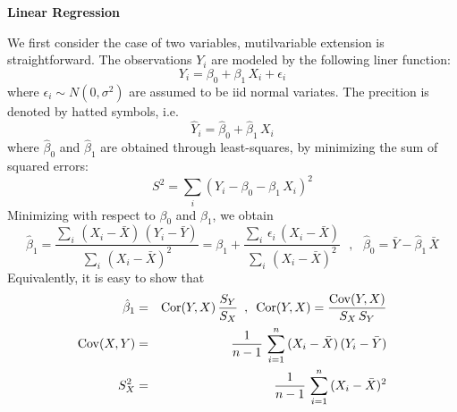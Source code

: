 \documentclass[aps,prl,preprint,superscriptaddress]{revtex4-1}
\begin{document}
% 

\vspace{0.5cm}

\begin{center}
{\bf Linear Regression}
\end{center}

We first consider the case of two variables, mutilvariable extension is straightforward. The observations $Y_i$ 
are modeled by the following liner function:
%
\begin{equation}
Y_i = \beta_0 + \beta_1\, X_i + \epsilon_i
\end{equation}
%
where $\epsilon_i \sim N(0,\sigma^2)$ are assumed to be iid normal variates. The precition is denoted by hatted symbols, 
i.e.
%
\begin{equation}
{\hat Y}_i = {\hat \beta}_0 + {\hat \beta}_1\, X_i
\end{equation}
%
where ${\hat \beta}_0$ and ${\hat \beta}_1$ are obtained through least-squares, by minimizing the sum of squared
errors:
%
\begin{equation}
S^2 = \sum_i \left( Y_i - \beta_0 - \beta_1\, X_i \right)^2
\end{equation}
%
Minimizing with respect to $\beta_0$ and $\beta_1$, we obtain
%
\begin{equation}
{\hat \beta}_1 = \frac{\sum_i\, ( X_i - \bar{X} )\, (Y_i - {\bar Y})}{\sum_i\, (X_i - {\bar X})^2} 
               = \beta_1 + \frac{\sum_i\, \epsilon_i\, (X_i - {\bar X}) }{\sum_i\, (X_i - {\bar X})^2}  \,\,\,\, , \,\,\,\,
{\hat \beta}_0 = {\bar Y} - {\hat \beta}_1\, {\bar X}
\end{equation}
%
Equivalently, it is easy to show that
%
\begin{eqnarray}
{\hat \beta}_1 &=& {\rm Cor}(Y,X)\, \frac{S_Y}{S_X} \,\,\, , \,\,\, {\rm Cor}(Y,X) 
          = \frac{{\rm Cov}(Y,X)}{S_X\, S_Y} \nonumber\\
{\rm Cov}(X,Y) &=& \frac{1}{n-1}\, \sum_{i=1}^n\, (X_i - {\bar X})\, (Y_i - {\bar Y}) \nonumber\\
S_X^2 &=& \frac{1}{n-1}\, \sum_{i=1}^n\, (X_i - {\bar X})^2
\end{eqnarray}
%

\vspace{0.5cm}
\end{document}
